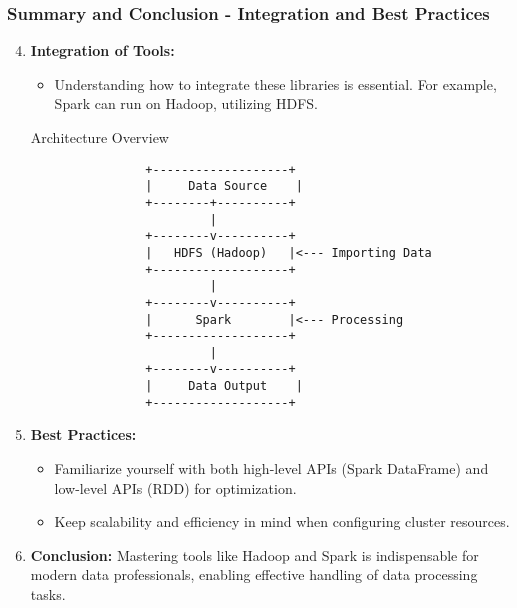\documentclass[aspectratio=169]{beamer}
\begin{document}
\begin{frame}[fragile]
    \frametitle{Summary and Conclusion - Integration and Best Practices}
    \begin{enumerate}
        \setcounter{enumi}{3}  %
        \item \textbf{Integration of Tools:}
            \begin{itemize}
                \item Understanding how to integrate these libraries is essential. For example, Spark can run on Hadoop, utilizing HDFS.
            \end{itemize}
            \begin{block}{Architecture Overview}
                \begin{lstlisting}
                +-------------------+
                |     Data Source    |
                +--------+----------+
                         |
                +--------v----------+
                |   HDFS (Hadoop)   |<--- Importing Data
                +-------------------+
                         |
                +--------v----------+
                |      Spark        |<--- Processing
                +-------------------+
                         |
                +--------v----------+
                |     Data Output    |
                +-------------------+
                \end{lstlisting}
            \end{block}
        
        \item \textbf{Best Practices:}
            \begin{itemize}
                \item Familiarize yourself with both high-level APIs (Spark DataFrame) and low-level APIs (RDD) for optimization.
                \item Keep scalability and efficiency in mind when configuring cluster resources.
            \end{itemize}

        \item \textbf{Conclusion:}
            Mastering tools like Hadoop and Spark is indispensable for modern data professionals, enabling effective handling of data processing tasks.
    \end{enumerate}
\end{frame}
\end{document}
